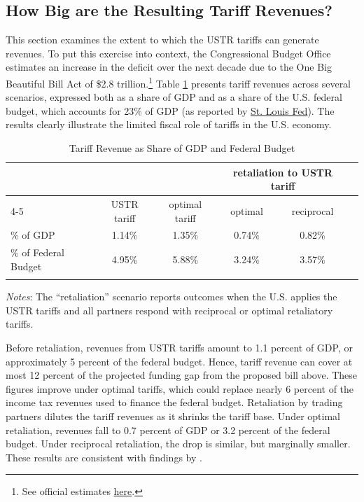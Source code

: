 \documentclass[12pt]{article}
\begin{document}
\subsection{How Big are the Resulting Tariff Revenues?}
This section examines the extent to which the USTR tariffs can generate revenues. %
To put this exercise into context, the Congressional Budget Office estimates an increase in the deficit over the next decade due to the One Big Beautiful Bill Act of \$2.8 trillion.\footnote{See official estimates \href{https://www.cbo.gov/publication/61486\#data-supplemental}{here}.} Table \ref{tab: T3} presents tariff revenues across several scenarios, expressed both as a share of GDP and as a share of the U.S. federal budget, which accounts for 23\% of GDP (as reported by \href{https://fred.stlouisfed.org/series/FYONGDA188S}{St. Louis Fed}). The results clearly illustrate the limited fiscal role of tariffs in the U.S. economy.

\begin{table}[htb]
\caption{Tariff Revenue as Share of GDP and Federal Budget}\label{tab: T3}
\centering
\begin{tabular}{lccccc}
\toprule
& & & \multicolumn{2}{c}{retaliation to USTR tariff} \\
\cmidrule(lr){4-5}
& USTR tariff & optimal tariff &  optimal & reciprocal \\
\midrule
\% of GDP &1.14\% & 1.35\% &0.74\% & 0.82\% \\ \% of Federal Budget &4.95\% & 5.88\% &3.24\% & 3.57\% \\  \addlinespace[3pt]
 \bottomrule
\end{tabular}
\vspace{-5pt}
\begin{flushleft}
\footnotesize{\textit{Notes}: The ``retaliation'' scenario reports outcomes when the U.S. applies the USTR tariffs and all partners respond with reciprocal or optimal retaliatory tariffs.}
\end{flushleft}
\end{table}

Before retaliation, revenues from USTR tariffs amount to 1.1 percent of GDP, or approximately 5 percent of the federal budget. Hence, tariff revenue can cover at most 12 percent of the projected funding gap from the proposed bill above. These figures improve under optimal tariffs, which could replace nearly 6 percent of the income tax revenues used to finance the federal budget. Retaliation by trading partners dilutes the tariff revenues as it shrinks the tariff base. Under optimal retaliation, revenues fall to 0.7 percent of GDP or 3.2 percent of the federal budget. Under reciprocal retaliation, the drop is similar, but marginally smaller. These results are consistent with findings by \citet{Lashkaripour_jeea}.%
\end{document}
